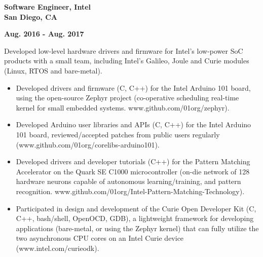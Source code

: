 \documentclass[6pt]{article}
\begin{document}
\hspace*{-\parindent}%
\begin{minipage}{20em}
{\bfseries Software Engineer, Intel \\
San Diego, CA}
\end{minipage}
\hfill
\begin{minipage}{12em}
{
    \bfseries \hfill Aug. 2016 - Aug. 2017 \\

}
\end{minipage}
\break
\break
Developed low-level hardware drivers and firmware for Intel's low-power SoC products
with a small team, including Intel's Galileo, Joule and Curie modules (Linux, RTOS and
bare-metal).
\begin{itemize}
    \item Developed drivers and firmware (C, C++) for the Intel Arduino 101 board, using the
          open-source Zephyr project (co-operative scheduling real-time kernel for small
          embedded systems. www.github.com/01org/zephyr).
    \item Developed Arduino user libraries and APIs (C, C++) for the Intel Arduino 101 board,
          reviewed/accepted patches from public users regularly \\
          (www.github.com/01org/corelibs-arduino101).
    \item Developed drivers and developer tutorials (C++) for the Pattern Matching Accelerator
          on the Quark SE C1000 microcontroller (on-die network of 128 hardware neurons
          capable of autonomous learning/training, and pattern recognition.
          www.github.com/01org/Intel-Pattern-Matching-Technology).
    \item Participated in design and development of the Curie Open Developer Kit (C, C++,
          bash/shell, OpenOCD, GDB), a lightweight framework for developing applications
          (bare-metal, or using the Zephyr kernel) that can fully utilize the two asynchronous
          CPU cores on an Intel Curie device (www.intel.com/curieodk).
\end{itemize}
\end{document}
